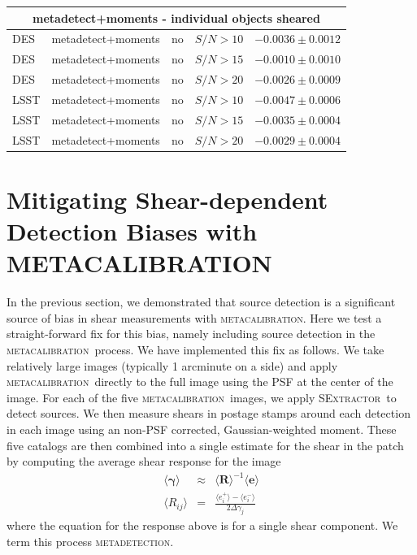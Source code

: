 \documentclass[fleqn,useAMS,usenatbib]{mnras}
\newcommand{\snr}{$S/N$}
\newcommand{\mcal}{\textsc{metacalibration}}
\newcommand{\mdet}{\textsc{metadetection}}
\newcommand{\sx}{\textsc{SExtractor}}
\begin{document}
\begin{table}
\begin{tabular}{|l|l|l|c|c|}
    \hline
    \multicolumn{5}{c}{metadetect+moments - individual objects sheared}\\
    \hline
    DES   & metadetect+moments & no & \snr$ > 10$ & $-0.0036 \pm 0.0012$  \\
    DES   & metadetect+moments & no & \snr$ > 15$ & $-0.0010 \pm 0.0010$  \\
    DES   & metadetect+moments & no & \snr$ > 20$ & $-0.0026 \pm 0.0009$  \\
    \hline
    LSST  & metadetect+moments & no & \snr$ > 10$ & $-0.0047 \pm 0.0006$  \\
    LSST  & metadetect+moments & no & \snr$ > 15$ & $-0.0035 \pm 0.0004$  \\
    LSST  & metadetect+moments & no & \snr$ > 20$ & $-0.0029 \pm 0.0004$  \\
    \hline
  \end{tabular}

\end{table}


\section{Mitigating Shear-dependent Detection Biases with \textsc{METACALIBRATION}}

In the previous section, we demonstrated that source detection is a significant
source of bias in shear measurements with \mcal. Here we test a straight-forward
fix for this bias, namely including source detection in the \mcal\ process. We
have implemented this fix as follows. We take relatively large images (typically
1 arcminute on a side) and apply \mcal\ directly to the full image using the
PSF at the center of the image. For each of the five \mcal\ images, we apply
\sx\ to detect sources. We then measure shears in postage stamps around each
detection in each image using an non-PSF corrected, Gaussian-weighted moment.
These five catalogs are then combined into a single estimate for the shear in
the patch by computing the average shear response for the image
\begin{eqnarray}
\langle \boldsymbol\gamma \rangle &\approx& \langle \boldsymbol{R}\rangle^{-1}\langle\boldsymbol{e}\rangle\\
\langle R_{ij}\rangle &=& \frac{\langle e_i^{+}\rangle - \langle e_i^{-}\rangle}{2\Delta\gamma_j}
\end{eqnarray}
where the equation for the response above is for a single shear component. We term this
process \mdet.
\end{document}
